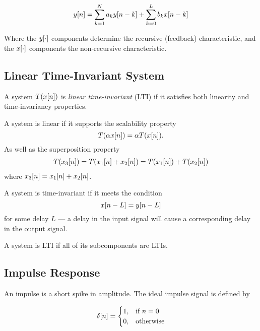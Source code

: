 \documentclass[11pt]{article}
\let\originalleft\left
\let\originalright\right
\renewcommand{\left}{\mathopen{}\mathclose\bgroup\originalleft}
\renewcommand{\right}{\aftergroup\egroup\originalright}
\def\lsqb{\left[}
\def\rsqb{\right]}
\def\sqb#1{\lsqb #1 \rsqb}
\def\xsig{x\sqb{n}}
\begin{document}
\begin{equation}
    y\sqb{n} = \sum_{k=1}^N a_k y\sqb{n - k} + \sum_{k=0}^L b_k x\sqb{n - k}
\end{equation}

Where the $y\sqb{\cdot}$ components determine the recursive (feedback) characteristic, and the $x\sqb{\cdot}$ components the non-recursive characteristic.

\subsection{Linear Time-Invariant System}

A system $T(x\sqb{n})$ is \textit{linear time-invariant} (LTI) if it satisfies both linearity and time-invariancy properties.

A system is linear if it supports the scalability property 
\begin{equation}
    T(\alpha \xsig) = \alpha T(\xsig).
\end{equation}
As well as the superposition property 
\begin{gather}
    T(x_3\sqb{n}) = T(x_1\sqb{n} + x_2\sqb{n}) =  T(x_1\sqb{n}) + T(x_2\sqb{n})
\end{gather}
where $x_3\sqb{n} = x_1\sqb{n} + x_2\sqb{n}$.

A system is time-invariant if it meets the condition
\begin{equation}
    x\sqb{n - L} = y\sqb{n - L}
\end{equation}
for some delay $L$ --- a delay in the input signal will cause a corresponding delay in the output signal.

A system is LTI if all of its subcomponents are LTIs.

\subsection{Impulse Response}
An impulse is a short spike in amplitude. The ideal impulse signal is defined by

\begin{equation}
    \delta\sqb{n} =
        \begin{cases}
            1, & \text{if } n = 0 \\
            0, & \text{otherwise}
        \end{cases}
\end{equation}
\end{document}
